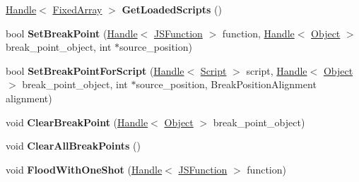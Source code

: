 \begin{DoxyCompactItemize}
\item 
\hypertarget{classv8_1_1internal_1_1_debug_aede9b294a7515c5c79e3b3c53ac1706e}{}\hyperlink{classv8_1_1internal_1_1_handle}{Handle}$<$ \hyperlink{classv8_1_1internal_1_1_fixed_array}{Fixed\+Array} $>$ {\bfseries Get\+Loaded\+Scripts} ()\label{classv8_1_1internal_1_1_debug_aede9b294a7515c5c79e3b3c53ac1706e}

\item 
\hypertarget{classv8_1_1internal_1_1_debug_aa047b66d72a7082e5eee6e9d91ac9424}{}bool {\bfseries Set\+Break\+Point} (\hyperlink{classv8_1_1internal_1_1_handle}{Handle}$<$ \hyperlink{classv8_1_1internal_1_1_j_s_function}{J\+S\+Function} $>$ function, \hyperlink{classv8_1_1internal_1_1_handle}{Handle}$<$ \hyperlink{classv8_1_1internal_1_1_object}{Object} $>$ break\+\_\+point\+\_\+object, int $\ast$source\+\_\+position)\label{classv8_1_1internal_1_1_debug_aa047b66d72a7082e5eee6e9d91ac9424}

\item 
\hypertarget{classv8_1_1internal_1_1_debug_aacfd725386e9637b2434202125c51db7}{}bool {\bfseries Set\+Break\+Point\+For\+Script} (\hyperlink{classv8_1_1internal_1_1_handle}{Handle}$<$ \hyperlink{classv8_1_1internal_1_1_script}{Script} $>$ script, \hyperlink{classv8_1_1internal_1_1_handle}{Handle}$<$ \hyperlink{classv8_1_1internal_1_1_object}{Object} $>$ break\+\_\+point\+\_\+object, int $\ast$source\+\_\+position, Break\+Position\+Alignment alignment)\label{classv8_1_1internal_1_1_debug_aacfd725386e9637b2434202125c51db7}

\item 
\hypertarget{classv8_1_1internal_1_1_debug_aa8fadbecef2c2a6f8020c9da58153a38}{}void {\bfseries Clear\+Break\+Point} (\hyperlink{classv8_1_1internal_1_1_handle}{Handle}$<$ \hyperlink{classv8_1_1internal_1_1_object}{Object} $>$ break\+\_\+point\+\_\+object)\label{classv8_1_1internal_1_1_debug_aa8fadbecef2c2a6f8020c9da58153a38}

\item 
\hypertarget{classv8_1_1internal_1_1_debug_a324006627d768db3535d7913d469e643}{}void {\bfseries Clear\+All\+Break\+Points} ()\label{classv8_1_1internal_1_1_debug_a324006627d768db3535d7913d469e643}

\item 
\hypertarget{classv8_1_1internal_1_1_debug_a9cb718fee7207c99107fb008ec8df6b4}{}void {\bfseries Flood\+With\+One\+Shot} (\hyperlink{classv8_1_1internal_1_1_handle}{Handle}$<$ \hyperlink{classv8_1_1internal_1_1_j_s_function}{J\+S\+Function} $>$ function)\label{classv8_1_1internal_1_1_debug_a9cb718fee7207c99107fb008ec8df6b4}


\end{DoxyCompactItemize}
